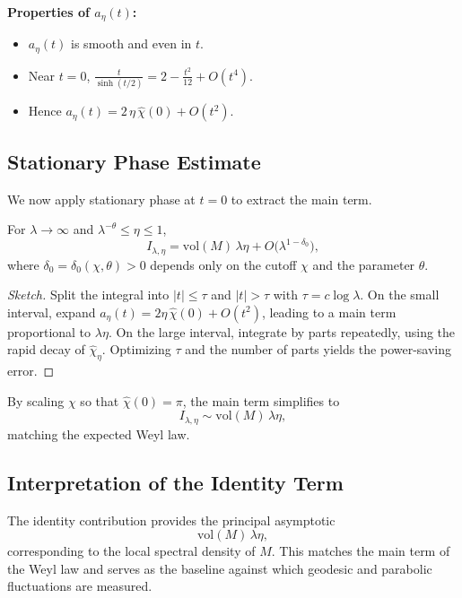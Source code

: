 \noindent\textbf{Properties of $a_\eta(t)$:}
\begin{itemize}
  \item $a_\eta(t)$ is smooth and even in $t$.
  \item Near $t=0$, $\frac{t}{\sinh(t/2)}=2-\tfrac{t^2}{12}+O(t^4)$.
  \item Hence $a_\eta(t) = 2\,\eta\,\widehat{\chi}(0) + O(t^2)$.
\end{itemize}

\subsection{Stationary Phase Estimate}

We now apply stationary phase at $t=0$ to extract the main term.

\begin{lemma}\label{lem:7.6-SP}
For $\lambda\to\infty$ and $\lambda^{-\theta}\le \eta\le 1$,
\[
  I_{\lambda,\eta}
  = \mathrm{vol}(M)\,\lambda\eta
    + O\!\big(\lambda^{1-\delta_0}\big),
\]
where $\delta_0=\delta_0(\chi,\theta)>0$ depends only on the cutoff $\chi$ and the parameter $\theta$.
\end{lemma}

\begin{proof}[Sketch]
Split the integral into $|t|\le \tau$ and $|t|>\tau$ with $\tau=c\log\lambda$.
On the small interval, expand $a_\eta(t)=2\eta\,\widehat{\chi}(0)+O(t^2)$,
leading to a main term proportional to $\lambda\eta$.  
On the large interval, integrate by parts repeatedly, using the rapid decay of
$\widehat{\chi}_\eta$.  
Optimizing $\tau$ and the number of parts yields the power-saving error.
\end{proof}

\begin{remark}[Normalization]
By scaling $\chi$ so that $\widehat{\chi}(0)=\pi$, the main term simplifies to
\[
  I_{\lambda,\eta} \sim \mathrm{vol}(M)\,\lambda\eta,
\]
matching the expected Weyl law.
\end{remark}

\subsection{Interpretation of the Identity Term}

The identity contribution provides the principal asymptotic
\[
  \mathrm{vol}(M)\,\lambda\eta,
\]
corresponding to the local spectral density of $M$.  
This matches the main term of the Weyl law and serves as the baseline against which
geodesic and parabolic fluctuations are measured.

